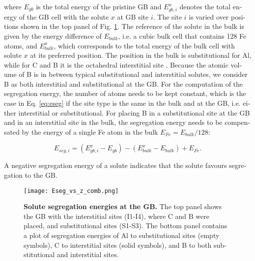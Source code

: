\documentclass[12pt,a4paper,twoside,twocolumn,english,english]{article}
\begin{document}
\begin{otherlanguage}{english}
where $E_{gb}$ is the total energy of the pristine GB and $E_{gb,i}^x$ denotes the total energy of the GB cell with the solute $x$ at GB site $i$. The site $i$ is varied over positions shown in the top panel of Fig. \ref{fig:gbseg}. The reference of the solute in the bulk is given by the energy difference of $E_{bulk}$, i.e. a cubic bulk cell that contains 128 Fe atoms, and $E_{bulk}^x$, which corresponds to the total energy of the bulk cell with solute $x$ at its preferred position. The position in the bulk is substitutional for Al, while for C and B it is the octahedral interstitial site \cite{fors_nature_2008}. Because the atomic volume of B is in between typical substitutional and interstitial solutes, we consider B as both interstitial and substitutional at the GB. For the computation of the segregation energy, the number of atoms needs to be kept constant, which is the case in Eq. \ref{eq:eseg} if the site type is the same in the bulk and at the GB, i.e. either interstitial or substitutional. For placing B in a substitutional site at the GB and in an interstitial site in the bulk, the segregation energy needs to be compensated by the energy of a single Fe atom in the bulk $E_{Fe}=E_{bulk}/128$:

\begin{equation}
E_{seg,i} = \left(E_{gb,i}^x - E_{gb}\right) - \left(E_{bulk}^x - E_{bulk}\right) + E_{Fe}.
    \label{eq:esegsubB}
\end{equation}

A negative segregation energy of a solute indicates that the solute favours segregation to the GB.


\begin{figure}[htbp]
\texttt{[image: Eseg\_vs\_z\_comb.png]}
\caption{\textbf{Solute segregation energies at the GB.} The top panel 
shows the GB 
with the interstitial sites (I1-I4), where C and B were placed, and substitutional sites (S1-S3). The bottom panel 
contains a plot of segregation energies of Al to substitutional sites (empty symbols), C to interstitial sites (solid symbols), and B to both substitutional and interstitial sites. 
}
\label{fig:gbseg}
\end{figure}


\end{otherlanguage}
\end{document}
